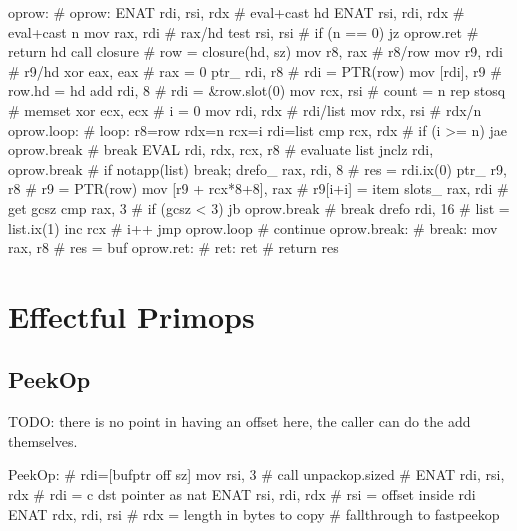 \begin{asm}
oprow:                                      # oprow:
	ENAT	rdi, rsi, rdx               #   eval+cast hd
	ENAT	rsi, rdi, rdx               #   eval+cast n
	mov	rax, rdi                    #   rax/hd
	test	rsi, rsi                    #   if (n == 0)
	jz	oprow.ret                   #     return hd
	call	closure                     #   row = closure(hd, sz)
	mov	r8, rax                     #   r8/row
	mov	r9, rdi                     #   r9/hd
	xor	eax, eax                    #   rax = 0
	ptr_	rdi, r8                     #   rdi = PTR(row)
	mov	[rdi], r9                   #   row.hd = hd
	add	rdi, 8                      #   rdi = &row.slot(0)
	mov	rcx, rsi                    #   count = n
	rep	stosq                       #   memset
	xor	ecx, ecx                    #   i = 0
	mov	rdi, rdx                    #   rdi/list
	mov	rdx, rsi                    #   rdx/n
oprow.loop:                                 # loop: r8=row rdx=n rcx=i rdi=list
	cmp	rcx, rdx                    #   if (i >= n)
	jae	oprow.break                 #     break
	EVAL	rdi, rdx, rcx, r8           #   evaluate list
	jnclz	rdi, oprow.break            #   if notapp(list) break;
	drefo_	rax, rdi, 8                 #   res = rdi.ix(0)
	ptr_	r9, r8                      #   r9      = PTR(row)
	mov	[r9 + rcx*8+8], rax         #   r9[i+i] = item
	slots_	rax, rdi                    #   get gcsz
	cmp	rax, 3                      #   if (gcsz < 3)
	jb	oprow.break                 #     break
	drefo	rdi, 16                     #   list = list.ix(1)
	inc	rcx                         #   i++
	jmp	oprow.loop                  #   continue
oprow.break:                                # break:
	mov	rax, r8                     #   res = buf
oprow.ret:                                  # ret:
	ret                                 #   return res
\end{asm}


\section{Effectful Primops}

\subsection{PeekOp}

TODO: there is no point in having an offset here, the caller can do the
add themselves.

\begin{asm}
PeekOp:                                     # rdi=[bufptr off sz]
	mov	rsi, 3                      #
	call	unpackop.sized              #
	ENAT	rdi, rsi, rdx               #   rdi = c dst pointer as nat
	ENAT	rsi, rdi, rdx               #   rsi = offset inside rdi
	ENAT	rdx, rdi, rsi               #   rdx = length in bytes to copy
	# fallthrough to fastpeekop
\end{asm}


